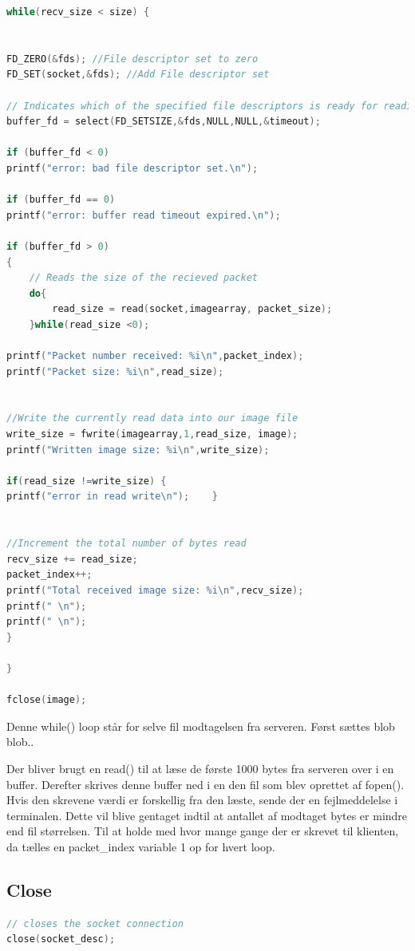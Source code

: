 \documentclass[12pt,fleqn,a4paper]{report}
\begin{document}
\begin{framed}
\begin{lstlisting}[language=C++]
while(recv_size < size) {
	
	
FD_ZERO(&fds); //File descriptor set to zero
FD_SET(socket,&fds); //Add File descriptor set
	
// Indicates which of the specified file descriptors is ready for reading, writing, or has an error condition pending
buffer_fd = select(FD_SETSIZE,&fds,NULL,NULL,&timeout);
	
if (buffer_fd < 0)
printf("error: bad file descriptor set.\n");
	
if (buffer_fd == 0)
printf("error: buffer read timeout expired.\n");
	
if (buffer_fd > 0)
{
	// Reads the size of the recieved packet
	do{
		read_size = read(socket,imagearray, packet_size);
	}while(read_size <0);
	
printf("Packet number received: %i\n",packet_index);
printf("Packet size: %i\n",read_size);
	
	
//Write the currently read data into our image file
write_size = fwrite(imagearray,1,read_size, image);
printf("Written image size: %i\n",write_size);

if(read_size !=write_size) {
printf("error in read write\n");    }
	
	
//Increment the total number of bytes read
recv_size += read_size;
packet_index++;
printf("Total received image size: %i\n",recv_size);
printf(" \n");
printf(" \n");
}

}

fclose(image);
\end{lstlisting}
\end{framed}

Denne while() loop står for selve fil modtagelsen fra serveren. Først sættes blob blob..

Der bliver brugt en read() til at læse de første 1000 bytes fra serveren over i en buffer. Derefter skrives denne buffer ned i en den fil som blev oprettet af fopen(). Hvis den skrevene værdi er forskellig fra den læste, sende der en fejlmeddelelse i terminalen. Dette vil blive gentaget indtil at antallet af modtaget bytes er mindre end fil størrelsen.
Til at holde med hvor mange gange der er skrevet til klienten, da tælles en packet\_index variable 1 op for hvert loop.

\subsection{Close}
\begin{framed}
\begin{lstlisting}[language=C++]
// closes the socket connection
close(socket_desc);
\end{lstlisting}
\end{framed}
\end{document}
